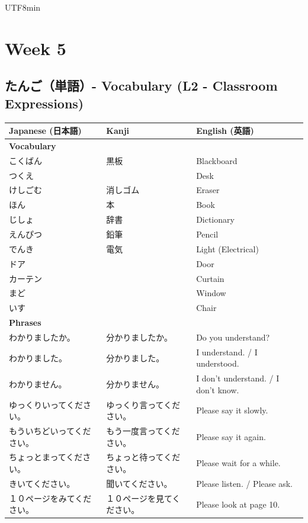 \documentclass[11pt]{article}
\begin{document}
\begin{CJK}{UTF8}{min}

\newpage
\section{Week 5}

\subsection{たんご（単語）- Vocabulary (L2 - Classroom Expressions)}
\begin{tabularx}{\linewidth}{X | X | X}
    \toprule
    \textbf{Japanese (日本語)} & \textbf{Kanji} & \textbf{English (英語)} \\
    \midrule
    \textbf{Vocabulary} &  & \\
    こくばん & 黒板 & Blackboard \\
    つくえ &  & Desk \\
    けしごむ & 消しゴム & Eraser \\
    ほん & 本 & Book \\
    じしょ & 辞書 & Dictionary \\
    えんぴつ & 鉛筆 & Pencil \\
    でんき & 電気 & Light (Electrical) \\
    ドア &  & Door \\
    カーテン &  & Curtain \\
    まど &  & Window \\
    いす &  & Chair \\
    \hline
    \textbf{Phrases} &  & \\
    わかりましたか。 & 分かりましたか。 & Do you understand? \\
    わかりました。 & 分かりました。 & I understand. / I understood. \\
    わかりません。 & 分かりません。 & I don't understand. / I don't know. \\
    ゆっくりいってください。 & ゆっくり言ってください。 & Please say it slowly. \\
    もういちどいってください。 & もう一度言ってください。 & Please say it again. \\
    ちょっとまってください。 & ちょっと待ってください。 & Please wait for a while. \\
    きいてください。 & 聞いてください。 & Please listen. / Please ask. \\
    １０ページをみてください。 & １０ページを見てください。 & Please look at page 10. \\
    \bottomrule
\end{tabularx}


\end{CJK}
\end{document}
